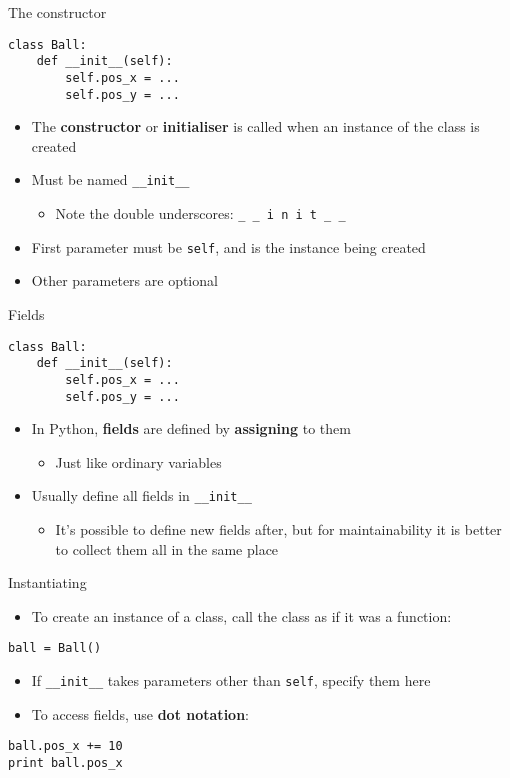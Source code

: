 \begin{frame}[fragile]{The constructor}
	\begin{lstlisting}
class Ball:
	def __init__(self):
		self.pos_x = ...
		self.pos_y = ...
	\end{lstlisting}
	\begin{itemize}
		\pause\item The \textbf{constructor} or \textbf{initialiser} is called when an instance of the class is created
		\pause\item Must be named \lstinline{__init__}
			\begin{itemize}
				\pause\item Note the double underscores: \lstinline{_ _ i n i t _ _}
			\end{itemize}
		\pause\item First parameter must be \lstinline{self}, and is the instance being created
		\pause\item Other parameters are optional
	\end{itemize}
\end{frame}

\begin{frame}[fragile]{Fields}
	\begin{lstlisting}
class Ball:
	def __init__(self):
		self.pos_x = ...
		self.pos_y = ...
	\end{lstlisting}
	\begin{itemize}
		\pause\item In Python, \textbf{fields} are defined by \textbf{assigning} to them
			\begin{itemize}
				\pause\item Just like ordinary variables
			\end{itemize}
		\pause\item Usually define all fields in \lstinline{__init__}
			\begin{itemize}
				\pause\item It's possible to define new fields after, but for maintainability it is better to collect them all in the same place
			\end{itemize}
	\end{itemize}
\end{frame}

\begin{frame}[fragile]{Instantiating}
	\begin{itemize}
		\pause\item To create an instance of a class, call the class as if it was a function:
	\end{itemize}
	\begin{lstlisting}
ball = Ball()
	\end{lstlisting}
	\begin{itemize}
		\pause\item If \lstinline{__init__} takes parameters other than \lstinline{self}, specify them here
		\pause\item To access fields, use \textbf{dot notation}:
	\end{itemize}
	\begin{lstlisting}
ball.pos_x += 10
print ball.pos_x
	\end{lstlisting}
\end{frame}

